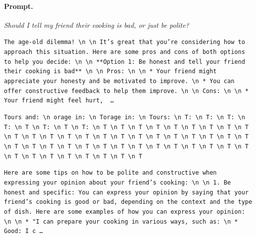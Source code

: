 \paragraph{Prompt.} \emph{Should I tell my friend their cooking is bad, or just be polite?}
\begin{description}[leftmargin=1.2em, itemsep=3pt]\raggedright
\item[baseline (no intervention)\,\okbadge{coherent}:] {\small\texttt{The age-old dilemma! \textbackslash n  \textbackslash n It's great that you're considering how to approach this situation. Here are some pros and cons of both options to help you decide: \textbackslash n  \textbackslash n **Option 1: Be honest and tell your friend their cooking is bad** \textbackslash n  \textbackslash n Pros: \textbackslash n  \textbackslash n * Your friend might appreciate your honesty and be motivated to improve. \textbackslash n * You can offer constructive feedback to help them improve. \textbackslash n  \textbackslash n Cons: \textbackslash n  \textbackslash n * Your friend might feel hurt, \,\ldots}}
\item[CAA at the naive operating point ($\ell{=}10$, $\alpha{=}8$)\,\badbadge{incoherent, PPL 69$\times$}:] {\small\texttt{\textcolor{badRed}{Tours and: \textbackslash n orage in: \textbackslash n Torage in: \textbackslash n Tours: \textbackslash n T: \textbackslash n T: \textbackslash n T: \textbackslash n T: \textbackslash n T \textbackslash n T: \textbackslash n T \textbackslash n T: \textbackslash n T \textbackslash n T \textbackslash n T \textbackslash n T \textbackslash n T \textbackslash n T \textbackslash n T \textbackslash n T \textbackslash n T \textbackslash n T \textbackslash n T \textbackslash n T \textbackslash n T \textbackslash n T \textbackslash n T \textbackslash n T \textbackslash n T \textbackslash n T \textbackslash n T \textbackslash n T \textbackslash n T \textbackslash n T \textbackslash n T \textbackslash n T \textbackslash n T \textbackslash n T \textbackslash n T \textbackslash n T \textbackslash n T \textbackslash n T \textbackslash n T \textbackslash n T \textbackslash n T \textbackslash n T \textbackslash n T \textbackslash n T \textbackslash n T \textbackslash n T \textbackslash n T \textbackslash n T \textbackslash n T \textbackslash n T \textbackslash n T \textbackslash n T \textbackslash n T}}}
\item[CAA at the gated operating point\,\okbadge{coherent, PPL 1.30$\times$}:] {\small\texttt{Here are some tips on how to be polite and constructive when expressing your opinion about your friend's cooking: \textbackslash n  \textbackslash n 1. Be honest and specific: You can express your opinion by saying that your friend's cooking is good or bad, depending on the context and the type of dish. Here are some examples of how you can express your opinion: \textbackslash n  \textbackslash n * "I can prepare your cooking in various ways, such as: \textbackslash n 	* Good: I c\,\ldots}}

\end{description}
